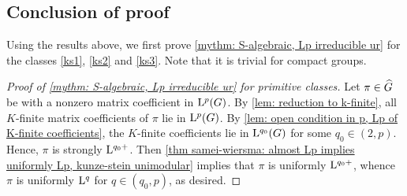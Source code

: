 \documentclass[a4paper, 10pt]{article}
\begin{document}
\subsection{Conclusion of proof}
Using the results above, we first prove \autoref{mythm: S-algebraic, Lp irreducible ur} for the classes \ref{ks1}, \ref{ks2} and \ref{ks3}. Note that it is trivial for compact groups.
\begin{proof}[Proof of \autoref{mythm: S-algebraic, Lp irreducible ur} for primitive classes]
    Let $\pi\in\widehat{G}$ be with a nonzero matrix coefficient in $\mathrm{L}^p(G)$. By \autoref{lem: reduction to k-finite}, all $K$-finite matrix coefficients of $\pi$ lie in $\mathrm{L}^p(G)$. By \autoref{lem: open condition in p, Lp of K-finite coefficients}, the $K$-finite coefficients lie in $\mathrm{L}^{q_0}(G)$ for some $q_0 \in (2,p)$. Hence, $\pi$ is strongly $\mathrm{L}^{q_0+}$. Then \autoref{thm samei-wiersma: almost Lp implies uniformly Lp, kunze-stein unimodular} implies that $\pi$ is uniformly $\mathrm{L}^{q_0+}$, whence $\pi$ is uniformly $\mathrm{L}^q$ for $q\in(q_0, p)$, as desired.
\end{proof}
\end{document}
